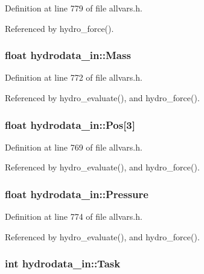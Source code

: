 Definition at line 779 of file allvars.h.



Referenced by hydro\_\-force().

\hypertarget{structhydrodata__in_a5fb05f5111cc5541a5f2d9ad647b0665}{
\subsubsection[{Mass}]{\setlength{\rightskip}{0pt plus 5cm}float {\bf hydrodata\_\-in::Mass}}}
\label{structhydrodata__in_a5fb05f5111cc5541a5f2d9ad647b0665}


Definition at line 772 of file allvars.h.



Referenced by hydro\_\-evaluate(), and hydro\_\-force().

\hypertarget{structhydrodata__in_af50edb8226de4bdcdbcc0f2679cc694d}{
\subsubsection[{Pos}]{\setlength{\rightskip}{0pt plus 5cm}float {\bf hydrodata\_\-in::Pos}\mbox{[}3\mbox{]}}}
\label{structhydrodata__in_af50edb8226de4bdcdbcc0f2679cc694d}


Definition at line 769 of file allvars.h.



Referenced by hydro\_\-evaluate(), and hydro\_\-force().

\hypertarget{structhydrodata__in_a95298759ae954d623a92d59f71d318ba}{
\subsubsection[{Pressure}]{\setlength{\rightskip}{0pt plus 5cm}float {\bf hydrodata\_\-in::Pressure}}}
\label{structhydrodata__in_a95298759ae954d623a92d59f71d318ba}


Definition at line 774 of file allvars.h.



Referenced by hydro\_\-evaluate(), and hydro\_\-force().

\hypertarget{structhydrodata__in_a7d38ae5b3289a90c4d33add0572942cc}{
\subsubsection[{Task}]{\setlength{\rightskip}{0pt plus 5cm}int {\bf hydrodata\_\-in::Task}}}
\label{structhydrodata__in_a7d38ae5b3289a90c4d33add0572942cc}


